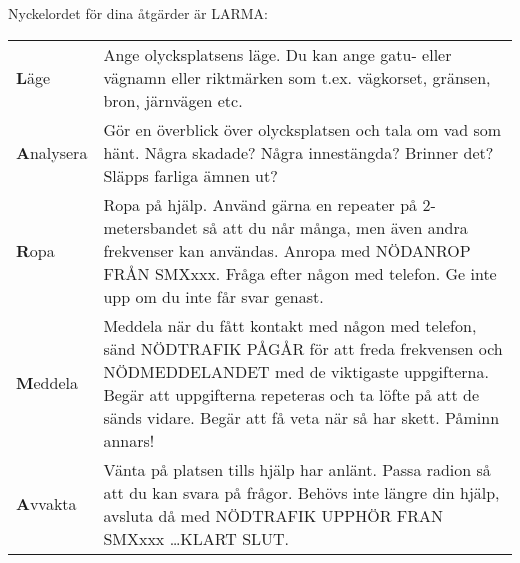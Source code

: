 Nyckelordet för dina åtgärder är LARMA:

\begin{tabular}{lp{5cm}}
  \textbf{L}äge &
  Ange olycksplatsens läge. Du kan ange gatu- eller vägnamn eller riktmärken som
  t.ex. vägkorset, gränsen, bron, järnvägen etc.
  \\
  \textbf{A}nalysera
  &
  Gör en överblick över
  olycksplatsen och tala om vad som hänt.  Några skadade? Några innestängda?
  Brinner det? Släpps farliga ämnen ut?
  \\
  \textbf{R}opa &
  Ropa på hjälp. Använd gärna en repeater på 2-metersbandet så att du når många,
  men även andra frekvenser kan användas.  Anropa med NÖDANROP FRÅN SMXxxx. Fråga
  efter någon med telefon. Ge inte upp om du inte får svar genast.
  \\
  \textbf{M}eddela &
  Meddela när du fått kontakt med någon med telefon, sänd NÖDTRAFIK PÅGÅR för att
  freda frekvensen och NÖDMEDDELANDET med de viktigaste uppgifterna. Begär att
  uppgifterna repeteras och ta löfte på att de sänds vidare. Begär att få veta när
  så har skett. Påminn annars!
  \\
  \textbf{A}vvakta
  &
  Vänta på platsen tills hjälp har
  anlänt. Passa radion så att du kan svara på frågor. Behövs inte längre din
  hjälp, avsluta då med NÖDTRAFIK UPPHÖR FRAN SMXxxx \dots KLART SLUT.
\end{tabular}

